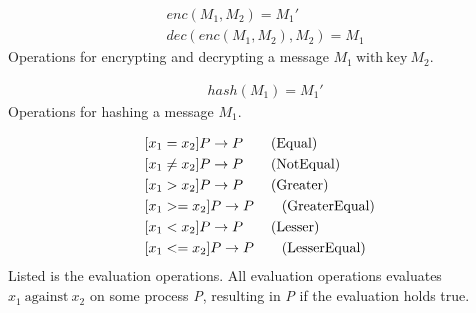 
\begin{align}
    &enc(M_1, M_2) = M_1' \tag{Encrypt}\\
    &dec(enc(M_1, M_2),M_2) = M_1 \tag{Decrypt}
\end{align}
Operations for encrypting and decrypting a message $M_1\ \mathrm{with\ key}\ M_2$.


\begin{align}
    &hash(M_1) = M_1' \tag{Hashing}
\end{align}
Operations for hashing a message $M_1$.


\begin{align}
    &[x_1 = x_2]P \rightarrow P \tag{Equal}\\
    &[x_1 \neq x_2]P \rightarrow P \tag{NotEqual}\\
    &[x_1 > x_2]P \rightarrow P \tag{Greater}\\
    &[x_1 >= x_2]P \rightarrow P \tag{GreaterEqual}\\
    &[x_1 < x_2]P \rightarrow P \tag{Lesser}\\
    &[x_1 <= x_2]P \rightarrow P \tag{LesserEqual}
\end{align}
Listed is the evaluation operations. All evaluation operations evaluates $x_1\ \mathrm{against}\ x_2$ on some process \textit{P}, resulting in \textit{P} if the evaluation holds true.


